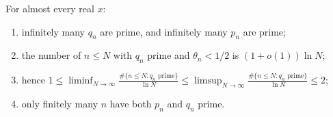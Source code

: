 \begin{theorem}\label{thm:oq-ae}
For almost every real $x$:
\begin{enumerate}[label=(\roman*)]
\item infinitely many $q_n$ are prime, and infinitely many $p_n$ are prime;
\item the number of $n \le N$ with $q_n$ prime and $\theta_n < 1/2$ is $(1 + o(1))\ln N$;
\item hence $\displaystyle 1 \le \liminf_{N\to\infty}\frac{\#\{n \le N: q_n \text{ prime}\}}{\ln N} \le \limsup_{N\to\infty}\frac{\#\{n \le N: q_n \text{ prime}\}}{\ln N} \le 2$;
\item only finitely many $n$ have both $p_n$ and $q_n$ prime.
\end{enumerate}
\end{theorem}

